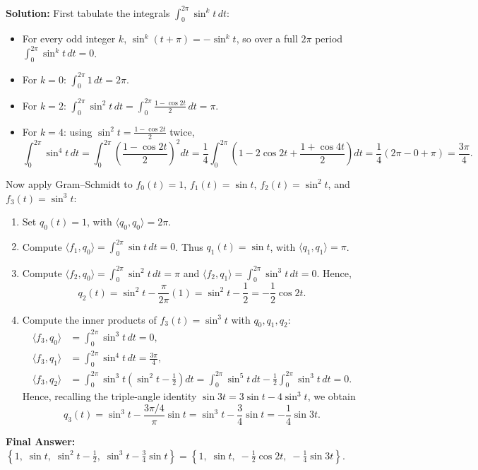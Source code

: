 \documentclass[11pt, letterpaper]{article}
\theoremstyle{definition}
\theoremstyle{remark}
\begin{document}
\textbf{Solution:} First tabulate the integrals $\int_0^{2\pi} \sin^k t\,dt$:
\begin{itemize}
    \item For every odd integer $k$, $\sin^k(t + \pi) = -\sin^k t$, so over a full $2\pi$ period $\int_0^{2\pi} \sin^k t\,dt = 0$.
    \item For $k = 0$: $\int_0^{2\pi} 1\,dt = 2\pi$.
    \item For $k = 2$: $\int_0^{2\pi} \sin^2 t\,dt = \int_0^{2\pi} \frac{1 - \cos 2t}{2}\,dt = \pi$.
    \item For $k = 4$: using $\sin^2 t = \frac{1 - \cos 2t}{2}$ twice,
    \[
    \int_0^{2\pi} \sin^4 t\,dt = \int_0^{2\pi} \left(\frac{1 - \cos 2t}{2}\right)^2 dt = \frac{1}{4}\int_0^{2\pi} \left(1 - 2\cos 2t + \frac{1 + \cos 4t}{2}\right) dt = \frac{1}{4}(2\pi - 0 + \pi) = \frac{3\pi}{4}.
    \]
\end{itemize}
Now apply Gram--Schmidt to $f_0(t) = 1$, $f_1(t) = \sin t$, $f_2(t) = \sin^2 t$, and $f_3(t) = \sin^3 t$:
\begin{enumerate}
    \item Set $q_0(t) = 1$, with $\langle q_0, q_0 \rangle = 2\pi$.
    \item Compute $\langle f_1, q_0 \rangle = \int_0^{2\pi} \sin t\,dt = 0$. Thus $q_1(t) = \sin t$, with $\langle q_1, q_1 \rangle = \pi$.
    \item Compute $\langle f_2, q_0 \rangle = \int_0^{2\pi} \sin^2 t\,dt = \pi$ and $\langle f_2, q_1 \rangle = \int_0^{2\pi} \sin^3 t\,dt = 0$. Hence,
    \[
    q_2(t) = \sin^2 t - \frac{\pi}{2\pi}(1) = \sin^2 t - \frac{1}{2} = -\frac{1}{2}\cos 2t.
    \]
    \item Compute the inner products of $f_3(t) = \sin^3 t$ with $q_0, q_1, q_2$:
    \begin{align*}
    \langle f_3, q_0 \rangle &= \int_0^{2\pi} \sin^3 t\,dt = 0, \\
    \langle f_3, q_1 \rangle &= \int_0^{2\pi} \sin^4 t\,dt = \frac{3\pi}{4}, \\
    \langle f_3, q_2 \rangle &= \int_0^{2\pi} \sin^3 t \left(\sin^2 t - \frac{1}{2}\right) dt = \int_0^{2\pi} \sin^5 t\,dt - \frac{1}{2}\int_0^{2\pi} \sin^3 t\,dt = 0.
    \end{align*}
    Hence, recalling the triple-angle identity $\sin 3t = 3\sin t - 4\sin^3 t$, we obtain
    \[
    q_3(t) = \sin^3 t - \frac{3\pi/4}{\pi}\sin t = \sin^3 t - \frac{3}{4}\sin t = -\frac{1}{4}\sin 3t.
    \]
\end{enumerate}
\textbf{Final Answer:} $\left\{1,\; \sin t,\; \sin^2 t - \frac{1}{2},\; \sin^3 t - \frac{3}{4}\sin t\right\} = \left\{1,\; \sin t,\; -\frac{1}{2}\cos 2t,\; -\frac{1}{4}\sin 3t\right\}$.
\end{document}

